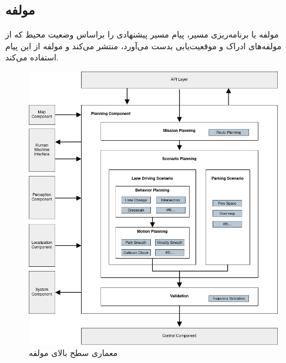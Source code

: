 \subsection{مولفه }
مولفه  یا برنامه‌ریزی مسیر، پیام مسیر پیشنهادی را براساس وضعیت محیط که از مولفه‌های ادراک و موقعیت‌یابی بدست می‌آورد، منتشر می‌کند و مولفه  از این پیام استفاده می‌کند.

\begin{figure}[h!]
    \centering
    \includegraphics[width=0.75\linewidth]{figures/Autoware_Planning_Architecture.png}
    \caption{معماری سطح بالای مولفه  \cite{Autoware:Documentation}}
    \label{fig:Autoware_Planning_Architecture}
\end{figure}

